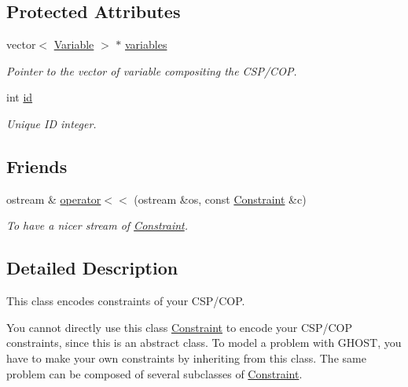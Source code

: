 \subsection*{Protected Attributes}
\begin{DoxyCompactItemize}
\item 
vector$<$ \hyperlink{classghost_1_1Variable}{Variable} $>$ $\ast$ \hyperlink{classghost_1_1Constraint_a1730b1b54d03d221e6e2a95185a2184b}{variables}
\begin{DoxyCompactList}\small\item\em Pointer to the vector of variable compositing the C\+S\+P/\+C\+OP. \end{DoxyCompactList}\item 
int \hyperlink{classghost_1_1Constraint_a5215df3cd5269adb4c5f6168191b9d47}{id}
\begin{DoxyCompactList}\small\item\em Unique ID integer. \end{DoxyCompactList}\end{DoxyCompactItemize}
\subsection*{Friends}
\begin{DoxyCompactItemize}
\item 
ostream \& \hyperlink{classghost_1_1Constraint_a7233f9b589a413e310991431039b05b6}{operator$<$$<$} (ostream \&os, const \hyperlink{classghost_1_1Constraint}{Constraint} \&c)
\begin{DoxyCompactList}\small\item\em To have a nicer stream of \hyperlink{classghost_1_1Constraint}{Constraint}. \end{DoxyCompactList}\end{DoxyCompactItemize}


\subsection{Detailed Description}
This class encodes constraints of your C\+S\+P/\+C\+OP. 

You cannot directly use this class \hyperlink{classghost_1_1Constraint}{Constraint} to encode your C\+S\+P/\+C\+OP constraints, since this is an abstract class. To model a problem with G\+H\+O\+ST, you have to make your own constraints by inheriting from this class. The same problem can be composed of several subclasses of \hyperlink{classghost_1_1Constraint}{Constraint}.

